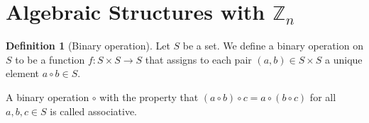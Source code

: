 \documentclass[12pt, titlepage]{amsart}
\newcommand\Z{{\mathbb Z}}
\newcommand\N{{\mathbb N}}
\newtheorem{theorem}{Theorem}[subsection]
\theoremstyle{definition}
\newtheorem{definition}{Definition}[subsection]
\begin{document}
%		

	
	\section{Algebraic Structures with $\Z_n$}

	
	\begin{definition}[Binary operation]\label{definition:bianry operation}
		Let $S$ be a set. We define a binary operation on $S$ to be a function $f:S \times S \to S$ that assigns to each pair $(a,b) \in S \times S$ a unique element $a \circ b \in S$.
		
		A binary operation $\circ$ with the property that $(a \circ b) \circ c = a \circ (b \circ c)$ for all $a, b, c \in S$ is called associative.
	\end{definition}
		
\end{document}
